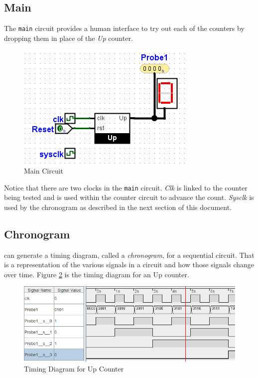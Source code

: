 \subsection{Main}

The \lstinline[columns=fixed]|main| circuit provides a human interface to try out each of the counters by dropping them in place of the \textit{Up} counter.

\begin{figure}[H]
	\centering
	\includegraphics[width=\maxwidth{.95\linewidth}]{gfx/06-06}
	\caption{Main Circuit}
	\label{fig:06-06}
\end{figure}

Notice that there are two clocks in the \lstinline[columns=fixed]|main| circuit. \textit{Clk} is linked to the counter being tested and is used within the counter circuit to advance the count. \textit{Sysclk} is used by the \LE chronogram as described in the next section of this document.

\subsection{Chronogram}

\LE can generate a timing diagram, called a \textit{chronogram}, for a sequential circuit. That is a representation of the various signals in a circuit and how those signals change over time. Figure \ref{fig:06-07} is the timing diagram for an Up counter.

\begin{figure}[H]
	\centering
	\includegraphics[width=\maxwidth{.95\linewidth}]{gfx/06-07}
	\caption{Timing Diagram for Up Counter}
	\label{fig:06-07}
\end{figure}

